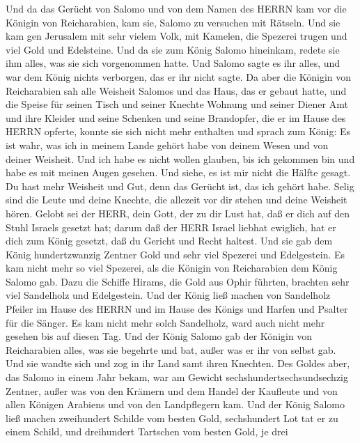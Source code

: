  Und da das Gerücht von Salomo und von dem Namen des HERRN
kam vor die Königin von Reicharabien, kam sie, Salomo zu versuchen mit
Rätseln.  Und sie kam gen Jerusalem mit sehr vielem Volk,
mit Kamelen, die Spezerei trugen und viel Gold und Edelsteine. Und da
sie zum König Salomo hineinkam, redete sie ihm alles, was sie sich
vorgenommen hatte.  Und Salomo sagte es ihr alles, und war
dem König nichts verborgen, das er ihr nicht sagte.  Da aber
die Königin von Reicharabien sah alle Weisheit Salomos und das Haus, das
er gebaut hatte,  und die Speise für seinen Tisch und seiner
Knechte Wohnung und seiner Diener Amt und ihre Kleider und seine
Schenken und seine Brandopfer, die er im Hause des HERRN opferte, konnte
sie sich nicht mehr enthalten  und sprach zum König: Es ist
wahr, was ich in meinem Lande gehört habe von deinem Wesen und von
deiner Weisheit.  Und ich habe es nicht wollen glauben, bis
ich gekommen bin und habe es mit meinen Augen gesehen. Und siehe, es ist
mir nicht die Hälfte gesagt. Du hast mehr Weisheit und Gut, denn das
Gerücht ist, das ich gehört habe.  Selig sind die Leute und
deine Knechte, die allezeit vor dir stehen und deine Weisheit hören.
 Gelobt sei der HERR, dein Gott, der zu dir Lust hat, daß er
dich auf den Stuhl Israels gesetzt hat; darum daß der HERR Israel
liebhat ewiglich, hat er dich zum König gesetzt, daß du Gericht und
Recht haltest.  Und sie gab dem König hundertzwanzig
Zentner Gold und sehr viel Spezerei und Edelgestein. Es kam nicht mehr
so viel Spezerei, als die Königin von Reicharabien dem König Salomo gab.
 Dazu die Schiffe Hirams, die Gold aus Ophir führten,
brachten sehr viel Sandelholz und Edelgestein.  Und der
König ließ machen von Sandelholz Pfeiler im Hause des HERRN und im Hause
des Königs und Harfen und Psalter für die Sänger. Es kam nicht mehr
solch Sandelholz, ward auch nicht mehr gesehen bis auf diesen Tag.
 Und der König Salomo gab der Königin von Reicharabien
alles, was sie begehrte und bat, außer was er ihr von selbst gab. Und
sie wandte sich und zog in ihr Land samt ihren Knechten. 
Des Goldes aber, das Salomo in einem Jahr bekam, war am Gewicht
sechshundertsechsundsechzig Zentner,  außer was von den
Krämern und dem Handel der Kaufleute und von allen Königen Arabiens und
von den Landpflegern kam.  Und der König Salomo ließ machen
zweihundert Schilde vom besten Gold, sechshundert Lot tat er zu einem
Schild,  und dreihundert Tartschen vom besten Gold, je drei

